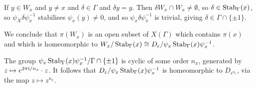 \documentclass[10pt,a4paper]{article}
\begin{document}
If $y \in W_x$ and $y \neq x$ and $\delta \in \Gamma$ and $\delta y = y$. Then $\delta W_x \cap W_x \neq \emptyset$, so $\delta \in \operatorname{Stab}_\Gamma(x)$, so $\psi_X \delta \psi_x^{-1}$ stabilises $\psi_x(y) \neq 0$, and so $\psi_x \delta \psi_x^{-1}$ is trivial, giving $\delta \in \Gamma \cap \{\pm 1\}$.

We conclude that $\pi(W_x)$ is an open subset of $X(\Gamma)$ which contains $\pi(x)$ and which is homeomorphic to $W_x/\operatorname{Stab}_\Gamma(x) \cong D_\varepsilon/ \psi_x \operatorname{Stab}_\Gamma(x) \psi_x^{-1}$.

The group $\psi_x \operatorname{Stab}_\Gamma(x) \psi_x^{-1} / \Gamma \cap \{\pm 1\}$ is cyclic of some order $n_x$, generated by $z \mapsto e^{2\pi\mathfrak{i}/n_x}\cdot z$. It follows that $D_\varepsilon/ \psi_x \operatorname{Stab}_\Gamma(x)\psi_x^{-1}$ is homeomorphic to $D_{\epsilon^{n_x}}$, via the map $z \mapsto z^{n_x}$.
\end{document}
